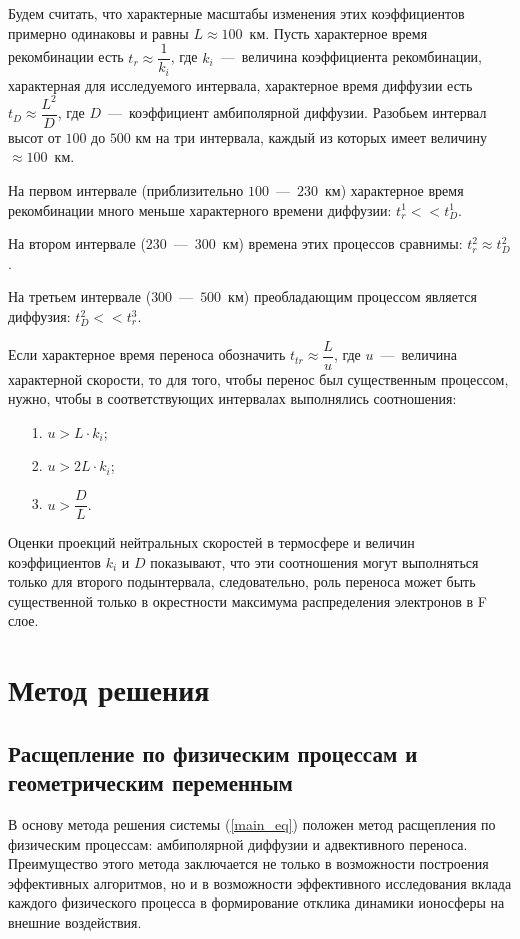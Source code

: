 \documentclass[14pt, a4paper]{extarticle}
\begin{document}
Будем считать, что характерные масштабы изменения этих коэффициентов примерно одинаковы и равны $L\approx 100$~км. Пусть характерное время рекомбинации есть $t_r\approx \dfrac{1}{k_i}$, где $k_i$~---~величина коэффициента рекомбинации, характерная для исследуемого интервала, характерное время диффузии есть $t_D \approx \dfrac{L^2}{D}$, где $D$~---~коэффициент амбиполярной диффузии. Разобьем интервал высот от $100$ до $500$ км на три интервала, каждый из которых имеет величину $\approx 100$~км.

На первом интервале (приблизительно $100$~---~$230$~км) характерное время рекомбинации много меньше характерного времени диффузии: $t_r^1 <<t_D^1$.

На втором интервале ($230$~---~$300$~км) времена этих процессов сравнимы: $t_r^2 \approx t_D^2$.

На третьем интервале ($300$~---~$500$~км) преобладающим процессом является диффузия: $t_D^2 << t_r^3$.

Если характерное время переноса обозначить $t_{tr} \approx \dfrac{L}{u}$, где $u$~---~величина характерной скорости, то для того, чтобы перенос был существенным процессом, нужно, чтобы в соответствующих интервалах выполнялись соотношения: \begin{itemize} \item[1.] $u> L\cdot k_i$; \item[2.] $u>2L\cdot k_i$; \item[3.] $u>\dfrac{D}{L}.$\end{itemize}

Оценки проекций нейтральных скоростей в термосфере и величин коэффициентов $k_i$ и $D$ показывают, что эти соотношения могут выполняться только для второго подынтервала, следовательно, роль переноса может быть существенной только в окрестности максимума распределения электронов в F слое.






\section{Метод решения}



\subsection{Расщепление по физическим процессам и геометрическим переменным}

В основу метода решения системы (\ref{main_eq}) положен метод расщепления по физическим процессам: амбиполярной диффузии и адвективного переноса. Преимущество этого метода заключается не только в возможности построения эффективных алгоритмов, но и в возможности эффективного исследования вклада каждого физического процесса в формирование отклика динамики ионосферы на внешние воздействия. 
\end{document}

